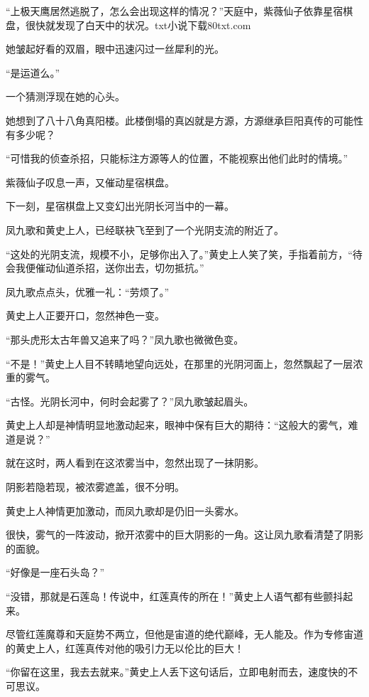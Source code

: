 
\begin{this_body}

“上极天鹰居然逃脱了，怎么会出现这样的情况？”天庭中，紫薇仙子依靠星宿棋盘，很快就发现了白天中的状况。txt小说下载80txt.com

她皱起好看的双眉，眼中迅速闪过一丝犀利的光。

“是运道么。”

一个猜测浮现在她的心头。

她想到了八十八角真阳楼。此楼倒塌的真凶就是方源，方源继承巨阳真传的可能性有多少呢？

“可惜我的侦查杀招，只能标注方源等人的位置，不能视察出他们此时的情境。”

紫薇仙子叹息一声，又催动星宿棋盘。

下一刻，星宿棋盘上又变幻出光阴长河当中的一幕。

凤九歌和黄史上人，已经联袂飞至到了一个光阴支流的附近了。

“这处的光阴支流，规模不小，足够你出入了。”黄史上人笑了笑，手指着前方，“待会我便催动仙道杀招，送你出去，切勿抵抗。”

凤九歌点点头，优雅一礼：“劳烦了。”

黄史上人正要开口，忽然神色一变。

“那头虎形太古年兽又追来了吗？”凤九歌也微微色变。

“不是！”黄史上人目不转睛地望向远处，在那里的光阴河面上，忽然飘起了一层浓重的雾气。

“古怪。光阴长河中，何时会起雾了？”凤九歌皱起眉头。

黄史上人却是神情明显地激动起来，眼神中保有巨大的期待：“这般大的雾气，难道是说？”

就在这时，两人看到在这浓雾当中，忽然出现了一抹阴影。

阴影若隐若现，被浓雾遮盖，很不分明。

黄史上人神情更加激动，而凤九歌却是仍旧一头雾水。

很快，雾气的一阵波动，掀开浓雾中的巨大阴影的一角。这让凤九歌看清楚了阴影的面貌。

“好像是一座石头岛？”

“没错，那就是石莲岛！传说中，红莲真传的所在！”黄史上人语气都有些颤抖起来。

尽管红莲魔尊和天庭势不两立，但他是宙道的绝代巅峰，无人能及。作为专修宙道的黄史上人，红莲真传对他的吸引力无以伦比的巨大！

“你留在这里，我去去就来。”黄史上人丢下这句话后，立即电射而去，速度快的不可思议。


\end{this_body}
